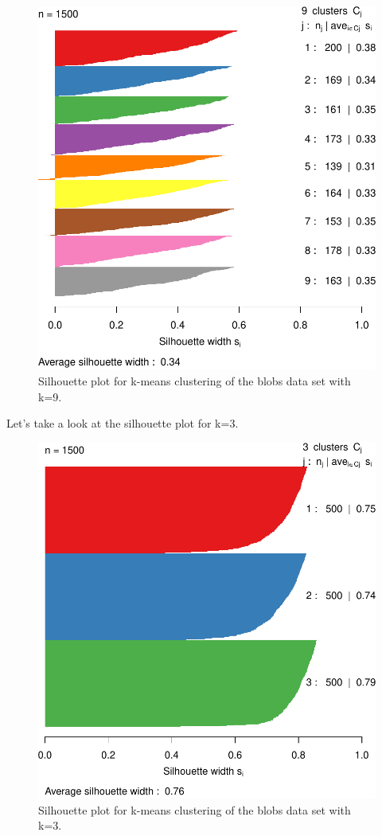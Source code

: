 \documentclass[]{book}
\newenvironment{Shaded}{\begin{snugshade}}{\end{snugshade}}
\newcommand{\KeywordTok}[1]{\textcolor[rgb]{0.13,0.29,0.53}{\textbf{{#1}}}}
\newcommand{\DataTypeTok}[1]{\textcolor[rgb]{0.13,0.29,0.53}{{#1}}}
\newcommand{\DecValTok}[1]{\textcolor[rgb]{0.00,0.00,0.81}{{#1}}}
\newcommand{\StringTok}[1]{\textcolor[rgb]{0.31,0.60,0.02}{{#1}}}
\newcommand{\OtherTok}[1]{\textcolor[rgb]{0.56,0.35,0.01}{{#1}}}
\newcommand{\NormalTok}[1]{{#1}}
\theoremstyle{definition}
\theoremstyle{definition}
\theoremstyle{definition}
\theoremstyle{remark}
\begin{document}
\begin{figure}

{\centering \includegraphics[width=0.6\linewidth]{09-clustering_files/figure-latex/silhouetteK9-1} 

}

\caption{Silhouette plot for k-means clustering of the blobs data set with k=9.}\label{fig:silhouetteK9}
\end{figure}

Let's take a look at the silhouette plot for k=3.

\begin{Shaded}
\end{Shaded}

\begin{figure}

{\centering \includegraphics[width=0.6\linewidth]{09-clustering_files/figure-latex/silhouetteK3-1} 

}

\caption{Silhouette plot for k-means clustering of the blobs data set with k=3.}\label{fig:silhouetteK3}
\end{figure}
\end{document}
